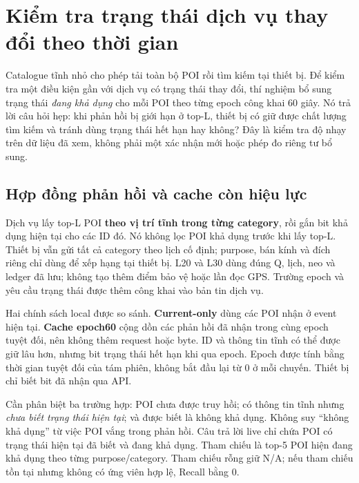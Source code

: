 
\section{Kiểm tra trạng thái dịch vụ thay đổi theo thời gian}
\label{sec:current-dynamic-status}

Catalogue tĩnh nhỏ cho phép tải toàn bộ POI rồi tìm kiếm tại thiết bị. Để kiểm
tra một điều kiện gần với dịch vụ có trạng thái thay đổi, thí nghiệm bổ sung
trạng thái \emph{đang khả dụng} cho mỗi POI theo từng epoch công khai 60 giây.
Nó trả lời câu hỏi hẹp: khi phản hồi bị giới hạn ở top-L, thiết bị có giữ
được chất lượng tìm kiếm và tránh dùng trạng thái hết hạn hay không? Đây là
kiểm tra độ nhạy trên dữ liệu đã xem, không phải một xác nhận mới hoặc phép
đo riêng tư bổ sung.

\subsection{Hợp đồng phản hồi và cache còn hiệu lực}

Dịch vụ lấy top-L POI \textbf{theo vị trí tĩnh trong từng category}, rồi gắn
bit khả dụng hiện tại cho các ID đó. Nó không lọc POI khả dụng trước khi lấy
top-L. Thiết bị vẫn gửi tất cả category theo lịch cố định; purpose, bán kính
và đích riêng chỉ dùng để xếp hạng tại thiết bị. L20 và L30 dùng đúng Q, lịch,
neo và ledger đã lưu; không tạo thêm điểm bảo vệ hoặc lần đọc GPS. Trường
epoch và yêu cầu trạng thái được thêm công khai vào bản tin dịch vụ.

Hai chính sách local được so sánh. \textbf{Current-only} dùng các POI nhận ở
event hiện tại. \textbf{Cache epoch60} cộng dồn các phản hồi đã nhận trong
cùng epoch tuyệt đối, nên không thêm request hoặc byte. ID và thông tin tĩnh
có thể được giữ lâu hơn, nhưng bit trạng thái hết hạn khi qua epoch. Epoch
được tính bằng thời gian tuyệt đối của tám phiên, không bắt đầu lại từ 0
ở mỗi chuyến. Thiết bị chỉ biết bit đã nhận qua API.

Cần phân biệt ba trường hợp: POI chưa được truy hồi; có thông tin tĩnh nhưng
\emph{chưa biết trạng thái hiện tại}; và được biết là không khả dụng. Không
suy ``không khả dụng'' từ việc POI vắng trong phản hồi. Câu trả lời live chỉ
chứa POI có trạng thái hiện tại đã biết và đang khả dụng. Tham chiếu là top-5
POI hiện đang khả dụng theo từng purpose/category. Tham chiếu rỗng giữ N/A;
nếu tham chiếu tồn tại nhưng không có ứng viên hợp lệ, Recall bằng 0.

